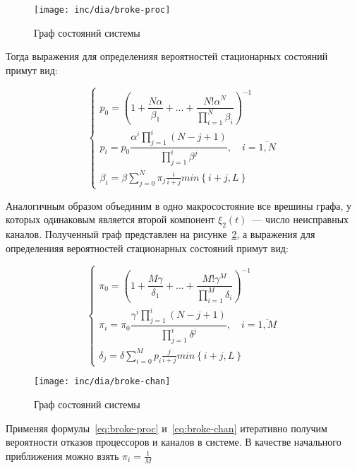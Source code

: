 \documentclass[utf8x, 12pt]{G7-32} %
\begin{document}
\begin{figure}[ht]
\centering
\texttt{[image: inc/dia/broke-proc]}
\caption{Граф состояний системы}
\label{fig:broke-proc}
\end{figure}

Тогда выражения для определенияя вероятностей стационарных состояний примут вид:

\begin{equation}
\label{eq:broke-proc}
\left\{
   \begin{array}{lcl}
	p_{0} = \left( 1 + \dfrac{N \alpha}{\beta_1} +  ... + \dfrac{N! \alpha^{N}}{\prod \limits_{i=1}^N \beta_i} \right) ^{-1} \\
	p_{i} = p_{0} \dfrac{\alpha^{i}\prod \limits_{j=1}^{i} (N-j+1)}{\prod \limits_{j=1}^i \beta^{j}}, \quad i = \overline{1,N}  \\ 
	\beta_i=\beta\sum\limits_{j=0}^N\pi_j\frac{i}{i+j}min\left\lbrace i+j,L\right\rbrace
   \end{array}
\right.
\end{equation}
 
Аналогичным образом объединим в одно макросостояние все врешины графа, у которых одинаковым является второй компонент $\xi_{2}(t)$~--- число неисправных каналов. Полученный граф представлен на рисунке~\ref{fig:broke-chan}, а выражения для определенияя вероятностей стационарных состояний примут вид:

\begin{equation}
\label{eq:broke-chan}
\left\{
   \begin{array}{lcl}
	\pi_{0} = \left( 1 + \dfrac{M \gamma}{\delta_1} +  ... + \dfrac{M! \gamma^{M}}{\prod \limits_{i=1}^M \delta_i} \right) ^{-1} \\
	\pi_{i} = \pi_{0} \dfrac{\gamma^{i}\prod \limits_{j=1}^{i} (N-j+1)}{\prod \limits_{j=1}^i \delta^{j}}, \quad i = \overline{1,M}  \\ 
	\delta_j=\delta\sum\limits_{i=0}^M p_i\frac{j}{i+j}min\left\lbrace i+j,L\right\rbrace
   \end{array}
\right.
\end{equation}

\begin{figure}[ht]
\centering
\texttt{[image: inc/dia/broke-chan]}
\caption{Граф состояний системы}
\label{fig:broke-chan}
\end{figure}

Применяя формулы~\ref{eq:broke-proc} и~\ref{eq:broke-chan} итеративно получим вероятности отказов процессоров и каналов в системе. В качестве начального приближения можно взять $\pi_i=\frac{1}{M}$
\end{document}
